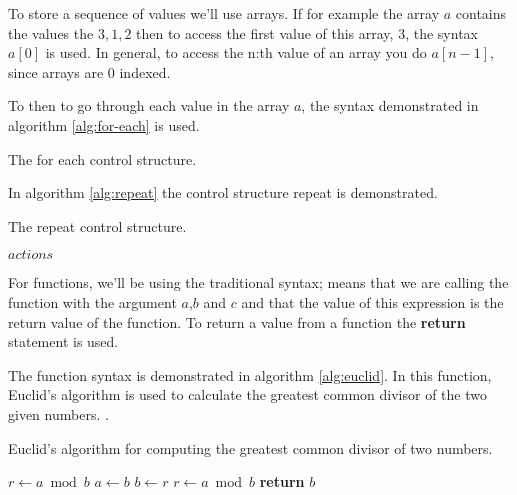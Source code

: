 To store a sequence of values we'll use arrays. If for example the
array $a$ contains the values the $3,1,2$ then to access the first
value of this array, $3$, the syntax $a[0]$ is used. In general, to
access the n:th value of an array you do $a[n-1]$, since arrays are 0
indexed.

To then to go through each value in the array $a$, the syntax
demonstrated in algorithm \ref{alg:for-each} is used.

\begin{algorithm}[H]
  \caption{The for each control structure.}
  \label{alg:for-each}
  \begin{algorithmic}[1]
    \EndForEach
  \end{algorithmic}
\end{algorithm}

In algorithm \ref{alg:repeat} the control structure repeat is
demonstrated.

\begin{algorithm}[H]
  \caption{The repeat control structure.}
  \label{alg:repeat}
  \begin{algorithmic}[1]
    \State $actions$ 
    \EndRepeatn
  \end{algorithmic}
\end{algorithm}

For functions, we'll be using the traditional syntax;
 means that we are calling the function
 with the argument $a$,$b$ and $c$ and that the value
of this expression is the return value of the function. To return a
value from a function the \textbf{return} statement is used.

The function syntax is demonstrated in algorithm \ref{alg:euclid}. In
this function, Euclid's algorithm is used to calculate the greatest
common divisor of the two given numbers.
\cite{cormen2009introduction_to_algo,weisstein:_euclid_algor}.

\begin{algorithm}
  \caption{Euclid's algorithm for computing the greatest common
    divisor of two numbers.}
  \label{alg:euclid}
  \begin{algorithmic}[1]
      \State $r\gets a\bmod b$
      \State $a\gets b$
      \State $b\gets r$
      \State $r\gets a\bmod b$
      \EndWhile
      \State \textbf{return} $b$
    \EndProcedure
  \end{algorithmic}
\end{algorithm}

